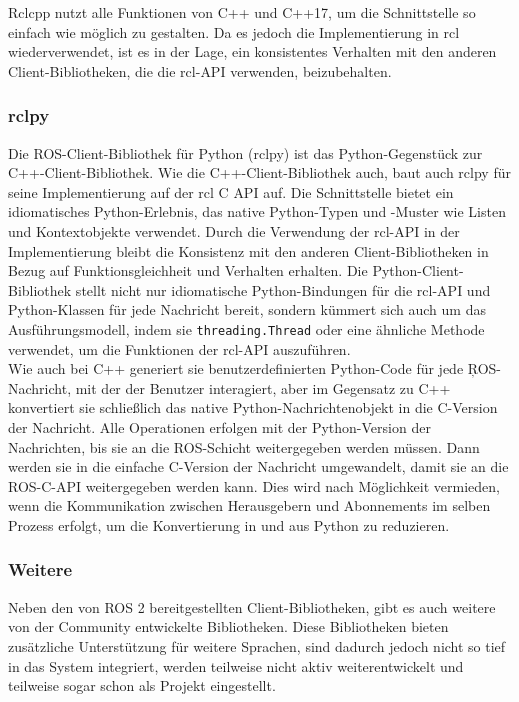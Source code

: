 \noindent
Rclcpp nutzt alle Funktionen von C++ und C++17, um die Schnittstelle so einfach wie möglich zu gestalten. Da es jedoch die Implementierung in \ac{rcl} wiederverwendet, ist es in der Lage, ein konsistentes Verhalten mit den anderen Client-Bibliotheken, die die \ac{rcl}-\ac{API} verwenden, beizubehalten.\\

\subsubsection{rclpy}\label{subsubsec:ROS2rclpy}
Die \ac{ROS}-Client-Bibliothek für Python (rclpy) ist das Python-Gegenstück zur C++-Client-Bibliothek. Wie die C++-Client-Bibliothek auch, baut auch rclpy für seine Implementierung auf der \ac{rcl} C \ac{API} auf. Die Schnittstelle bietet ein idiomatisches Python-Erlebnis, das native Python-Typen und -Muster wie Listen und Kontextobjekte verwendet. Durch die Verwendung der \ac{rcl}-\ac{API} in der Implementierung bleibt die Konsistenz mit den anderen Client-Bibliotheken in Bezug auf Funktionsgleichheit und Verhalten erhalten. Die Python-Client-Bibliothek stellt nicht nur idiomatische Python-Bindungen für die \ac{rcl}-\ac{API} und Python-Klassen für jede Nachricht bereit, sondern kümmert sich auch um das Ausführungsmodell, indem sie \texttt{threading.Thread} oder eine ähnliche Methode verwendet, um die Funktionen der \ac{rcl}-\ac{API} auszuführen.
\\

\noindent
Wie auch bei C++ generiert sie benutzerdefinierten Python-Code für jede \c{ROS}-Nachricht, mit der der Benutzer interagiert, aber im Gegensatz zu C++ konvertiert sie schließlich das native Python-Nachrichtenobjekt in die C-Version der Nachricht. Alle Operationen erfolgen mit der Python-Version der Nachrichten, bis sie an die \ac{ROS}-Schicht weitergegeben werden müssen. Dann werden sie in die einfache C-Version der Nachricht umgewandelt, damit sie an die \ac{ROS}-C-\ac{API} weitergegeben werden kann. Dies wird nach Möglichkeit vermieden, wenn die Kommunikation zwischen Herausgebern und Abonnements im selben Prozess erfolgt, um die Konvertierung in und aus Python zu reduzieren.\\

\subsubsection{Weitere}\label{subsubsec:ROS2Weitere}
Neben den von \ac{ROS} 2 bereitgestellten Client-Bibliotheken, gibt es auch weitere von der Community entwickelte Bibliotheken. Diese Bibliotheken bieten zusätzliche Unterstützung für weitere Sprachen, sind dadurch jedoch nicht so tief in das System integriert, werden teilweise nicht aktiv weiterentwickelt und teilweise sogar schon als Projekt eingestellt.
\\

